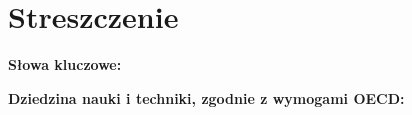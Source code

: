 \chapter*{Streszczenie}

\noindent\textbf{Słowa kluczowe:} 

\noindent\textbf{Dziedzina nauki i techniki, zgodnie z wymogami OECD:}
